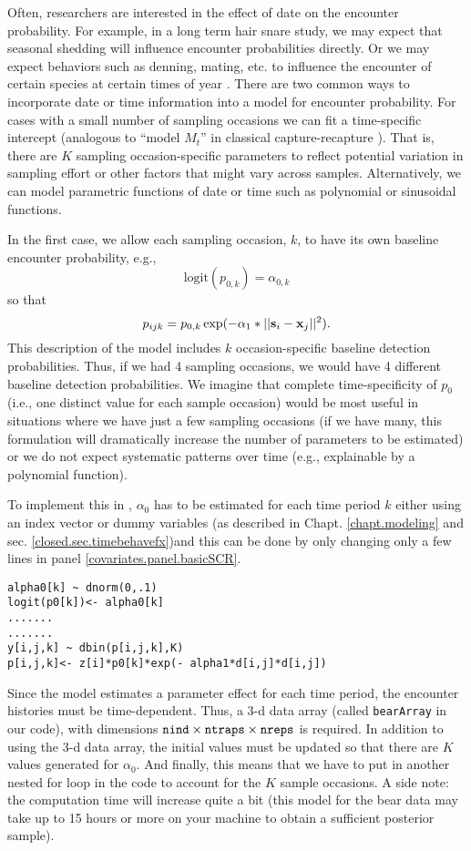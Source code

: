 Often, researchers are interested in the effect of date on the
encounter probability. For example, in a long term hair snare study,
we may expect that seasonal shedding \citep{wegan_etal:2012} will influence encounter
probabilities directly. Or we
may expect behaviors such as denning, mating, etc. to influence the encounter of
certain species at certain times of year \citep{kery_etal:2010}.  There are two common ways
to incorporate date or time information into a model for encounter
probability. For cases with a small number of sampling occasions we
can fit a time-specific intercept (analogous to ``model $M_{t}$'' in
classical capture-recapture \citep{otis_etal:1978}). That is, there
are $K$ sampling occasion-specific parameters to reflect potential
variation in sampling effort or other factors that might vary across
samples.  Alternatively, we can model parametric functions of date or
time such as polynomial or sinusoidal functions.

In the first case, we allow each sampling occasion, $k$, to have its
own baseline encounter probability, e.g.,
\[
\mbox{logit}(p_{0,k}) = \alpha_{0,k}
\]
so that
\[
p_{ijk} = p_{0,k} \exp(- \alpha_1*||{\bf s}_{i}-{\bf x}_{j}||^2).
\]
This description of the model includes $k$ occasion-specific baseline
detection probabilities.  Thus, if we had 4 sampling occasions, we
would have 4 different baseline detection probabilities.  We imagine
that complete time-specificity of $p_{0}$ 
(i.e., one distinct value for each sample occasion)
would be most useful in situations
where we have just a few sampling occasions (if we have many, this
formulation will dramatically increase the number of parameters to be
estimated) or we do not expect systematic patterns over time (e.g.,
explainable by a polynomial function).

To implement this in \jags, $\alpha_0$ has to be
estimated for each time period $k$ either using an index vector or
dummy variables (as described in Chapt. \ref{chapt.modeling} and sec. 
\ref{closed.sec.timebehavefx})and this can be done by only 
changing only a few lines in panel \ref{covariates.panel.basicSCR}.

\begin{verbatim}
alpha0[k] ~ dnorm(0,.1)
logit(p0[k])<- alpha0[k]
.......
.......
y[i,j,k] ~ dbin(p[i,j,k],K)
p[i,j,k]<- z[i]*p0[k]*exp(- alpha1*d[i,j]*d[i,j])
\end{verbatim}

Since the model estimates a parameter effect for each time period, the
encounter histories must be time-dependent.  Thus, a 3-d data array
(called \mbox{\tt bearArray} in our code), with dimensions $\mbox{\tt
  nind} \times \mbox{\tt ntraps} \times \mbox{\tt nreps}$ is
required. In addition to using the 3-d data array, the initial values
must be updated so that there are $K$ values generated for $\alpha_0$.
And finally, this means that we have to put in another nested for loop
in the code to account for the $K$ sample occasions.  A side note: the
computation time will increase quite a bit (this model for the bear
data may take up to 15 hours or more on your machine to obtain a
sufficient posterior sample).

